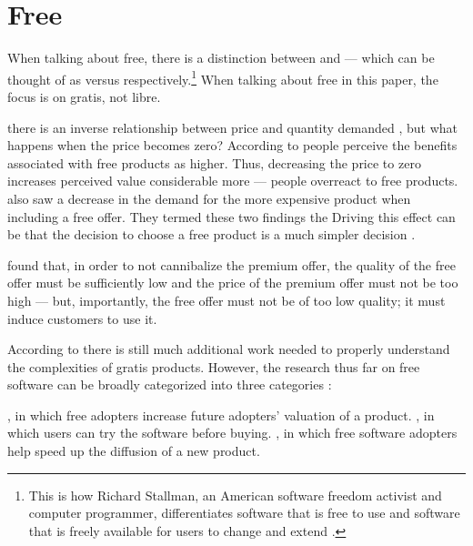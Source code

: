 \section{Free}
\label{section:free}

When talking about free, there is a distinction between  and  --- which can be thought of as  versus  respectively.\footnote{This is how Richard Stallman, an American software freedom activist and computer programmer, differentiates software that is free to use and software that is freely available for users to change and extend \citep{stallman2010}.} When talking about free in this paper, the focus is on gratis, not libre.

 there is an inverse relationship between price and quantity demanded \citep{osullivan2003}, but what happens when the price becomes zero? According to \citet{shampanier2007} people perceive the benefits associated with free products as higher. Thus, decreasing the price to zero increases perceived value considerable more --- people overreact to free products. \citet{shampanier2007} also saw a decrease in the demand for the more expensive product when including a free offer. They termed these two findings the  Driving this effect can be that the decision to choose a free product is a much simpler decision \citep{tversky1992,luce1998,iyengar2000,diederich2003}.

\citet{haruvy2001} found that, in order to not cannibalize the premium offer, the quality of the free offer must be sufficiently low and the price of the premium offer must not be too high --- but, importantly, the free offer must not be of too low quality; it must induce customers to use it.

According to \citet{shampanier2007} there is still much additional work needed to properly understand the complexities of gratis products. However, the research thus far on free software can be broadly categorized into three categories \citep{jiang2010}:

\begin{enum}
  , in which free adopters increase future adopters' valuation of a product.
  , in which users can try the software before buying.
  , in which free software adopters help speed up the diffusion of a new product.
\end{enum}

